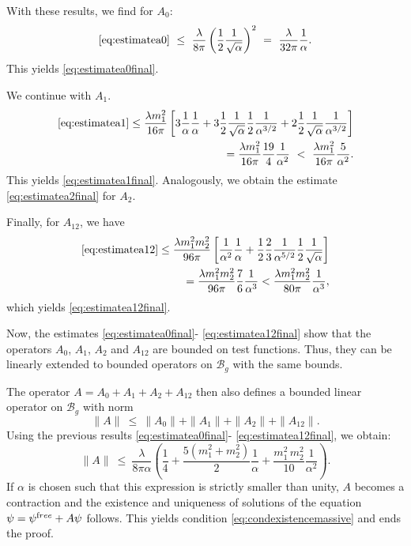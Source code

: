 \documentclass[b5paper,draft,openbib,12pt]{memoir}
\newcommand{\free}{{\textup free}}
\newcommand{\Banach}{\mathscr{B}}
\begin{document}
With these results, we find for $A_0$:
\begin{equation}
	\eqref{eq:estimatea0} ~\leq~ \frac{\lambda}{8\pi} \left(\frac{1}{2} \frac{1}{\sqrt{\alpha}}\right)^2 ~=~  \frac{\lambda}{32\pi} \frac{1}{\alpha}.
\end{equation}
This yields \eqref{eq:estimatea0final}.

We continue with $A_1$.
\begin{align}\notag
  \eqref{eq:estimatea1} \leq \frac{\lambda  m_1^2}{16\pi} \left[  3  \frac{1}{\alpha}  \frac{1}{\alpha} + 3  \frac{1}{2} \frac{1}{\sqrt{\alpha}}  \frac{1}{2} \frac{1}{\alpha^{3/2}} +2  \frac{1}{2} \frac{1}{\sqrt{\alpha}}  \frac{1}{\alpha^{3/2}} \right] \\
  = \frac{\lambda  m_1^2}{16\pi} \frac{19}{4} \frac{1}{\alpha^2} ~<~\frac{\lambda  m_1^2}{16\pi} \frac{5}{\alpha^2}.
\end{align}
This yields \eqref{eq:estimatea1final}. Analogously, we obtain the 
estimate \eqref{eq:estimatea2final} for $A_2$.

Finally, for $A_{12}$, we have
\begin{align}
  \eqref{eq:estimatea12} \leq \frac{\lambda  m_1^2 m_2^2}{96 \pi} \left[ \frac{1}{\alpha^2}  \frac{1}{\alpha} + \frac{1}{2}  \frac{2}{3} \frac{1}{\alpha^{5/2}}  \frac{1}{2} \frac{1}{\sqrt{\alpha}} \right] \notag\\
  = \frac{\lambda  m_1^2 m_2^2}{96\pi}  \frac{7}{6} \frac{1}{\alpha^3} < \frac{\lambda  m_1^2 m_2^2}{80 \pi}  \frac{1}{\alpha^3},
\end{align}
which yields \eqref{eq:estimatea12final}.

Now, the estimates \eqref{eq:estimatea0final}-
\eqref{eq:estimatea12final} show that the operators 
$A_0$, $A_1$, $A_2$ and $A_{12}$ are bounded on test functions. 
Thus, they can be linearly extended to bounded operators on 
$\Banach_g$ with the same bounds.

The operator $A = A_0 + A_1 + A_2 + A_{12}$ then also defines a 
bounded linear operator on $\Banach_g$ with norm
\begin{equation}
	\| A \| ~\leq~ \| A_0 \| + \| A_1 \| + \| A_2 \| + \| A_{12} \|.
\end{equation}
Using the previous results \eqref{eq:estimatea0final}-
\eqref{eq:estimatea12final}, we obtain:
\begin{equation}
	\|A \| ~\leq~ \frac{\lambda}{8\pi \alpha} \left( \frac{1}{4} + \frac{5(m_1^2 + m_2^2)}{2} \frac{1}{\alpha} + \frac{m_1^2 \, m_2^2}{10} \frac{1}{\alpha^2} \right).
\end{equation}
If $\alpha$ is chosen such that this expression is strictly smaller 
than unity, $A$ becomes a contraction and the existence and 
uniqueness of solutions of the equation $\psi = \psi^\free + A\psi$ 
follows. This yields condition \eqref{eq:condexistencemassive} and 
ends the proof.
\end{document}
